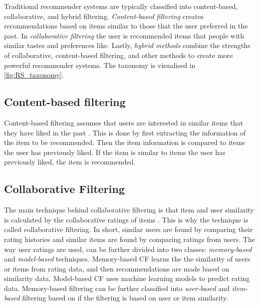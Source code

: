 \documentclass[english, 12pt, a4paper, sci, utf8, a-2b, online]{aaltothesis}
\begin{document}
Traditional recommender systems are typically classified into content-based, collaborative, and hybrid filtering. \textit{Content-based filtering} creates recommendations based on items similar to those that the user preferred in the past. In \textit{collaborative filtering} the user is recommended items that people with similar tastes and preferences like. Lastly, \textit{hybrid methods} combine the strengths of collaborative, content-based filtering, and other methods to create more powerful recommender systems. The taxonomy is visualised in \autoref{fig:RS_taxonomy}.



\subsection{Content-based filtering}
\label{subsec:content_based_filtering}



Content-based filtering assumes that users are interested in similar items that they have liked in the past \parencite{al2024traditional}. This is done by first extracting the information of the item to be recommended. Then the item information is compared to items the user has previously liked. If the item is similar to items the user has previously liked, the item is recommended. 

\subsection{Collaborative Filtering}
\label{subsec:collaborative_filtering}

The main technique behind collaborative filtering is that item and user similarity is calculated by the collaborative ratings of items \parencite{al2024traditional}. This is why the technique is called collaborative filtering. In short, similar users are found by comparing their rating histories and similar items are found by comparing ratings from users. The way user ratings are used, can be further divided into two classes: \textit{memory-based} and \textit{model-based} techniques. Memory-based CF learns the the similarity of users or items from rating data, and then recommendations are made based on similarity data. Model-based CF uses machine learning models to predict rating data. Memory-based filtering can be further classified into \textit{user-based} and \textit{item-based} filtering based on if the filtering is based on user or item similarity. 
\end{document}
